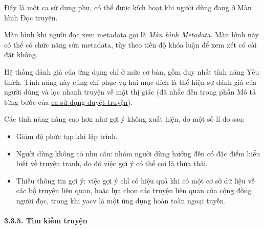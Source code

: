 \documentclass[
]{article}
\begin{document}
Đây là một ca sử dụng phụ, có thể được kích hoạt khi người dùng đang ở
Màn hình Đọc truyện.

Màn hình khi người đọc xem metadata gọi là \emph{Màn hình Metadata}. Màn
hình này có thể có chức năng sửa metadata, tùy theo tiến độ khóa luận để
xem xét có cài đặt không.

Hệ thống đánh giá của ứng dụng chỉ ở mức cơ bản, gồm duy nhất tính năng
Yêu thích. Tính năng này cũng chỉ phục vụ hai mục đích là thể hiện sự
đánh giá của người dùng và lọc nhanh truyện về mặt thị giác (đã nhắc đến
trong phần Mô tả từng bước của \protect\hyperlink{P3.3.2-browsing}{ca sử
dụng duyệt truyện}).

Các tính năng nâng cao hơn như gợi ý không xuất hiện, do một số lí do
sau:

\begin{itemize}
\item
  Giảm độ phức tạp khi lập trình.
\item
  Người dùng không có nhu cầu: nhóm người dùng hướng đến có đặc điểm
  hiểu biết về truyện tranh, do đó việc gợi ý có thể coi là thừa thãi.
\item
  Thiếu thông tin gợi ý: việc gợi ý chỉ có hiệu quả khi có một cơ sở dữ
  liệu về các bộ truyện liên quan, hoặc lựa chọn các truyện liên quan
  của cộng đồng người đọc, trong khi yacv là một ứng dụng hoàn toàn
  ngoại tuyến.
\end{itemize}

\hypertarget{tuxecm-kiux1ebfm-truyux1ec7n}{%
\paragraph{\texorpdfstring{3.3.5. Tìm kiếm truyện
}{3.3.5. Tìm kiếm truyện }}\label{tuxecm-kiux1ebfm-truyux1ec7n}}
\end{document}
